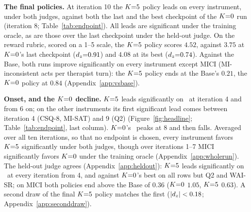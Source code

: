 \textbf{The final policies.} At iteration 10 the $K{=}5$ policy leads on every instrument, under
both judges, against both the last and the best checkpoint of the $K{=}0$ run (iteration 8;
Table~\ref{tab:endpoint}). All leads are significant under the training oracle, as are those over
the last checkpoint under the held-out judge. On the reward
rubric, scored on a 1--5 scale, the $K{=}5$ policy scores $4.52$, against $3.75$ at $K{=}0$'s last
checkpoint ($d_z{=}0.91$) and $4.08$ at its best ($d_z{=}0.74$).
Against the Base, both runs improve significantly on every instrument except MICI
(MI-inconsistent acts per therapist turn): the $K{=}5$ policy ends at the Base's $0.21$, the $K{=}0$
policy at $0.84$ (Appendix~\ref{app:vsbase}).

\textbf{\boldmath Onset, and the $K{=}0$ decline.} $K{=}5$ leads significantly on \QQ\ at iteration 4 and from
6 on; on the other instruments its first significant lead comes between iteration 4 (CSQ-8,
MI-SAT) and 9 (Q2) (Figure~\ref{fig:headline}; Table~\ref{tab:endpoint}, last column).
$K{=}0$'s \QQ\ peaks at 8 and then falls. Averaged over all ten iterations, so that no endpoint is chosen, every
instrument favors $K{=}5$ significantly under both judges, though over iterations 1--7 MICI significantly favors $K{=}0$ under the
training oracle (Appendix~\ref{app:wholerun}). The held-out judge agrees
(Appendix~\ref{app:heldout}): $K{=}5$ leads significantly on \QQ\ at every iteration from 4, and against $K{=}0$'s best on all rows but Q2 and WAI-SR; on MICI both
policies end above the Base of $0.36$ ($K{=}0$ $1.05$, $K{=}5$ $0.63$).
A second draw of the final $K{=}5$ policy matches the first ($|d_z| < 0.18$;
Appendix~\ref{app:seconddraw}).
